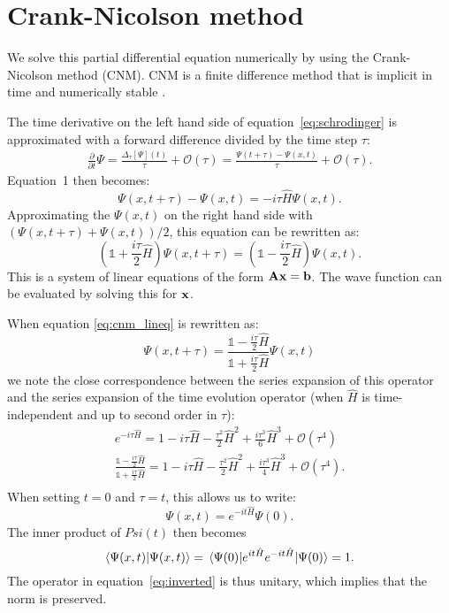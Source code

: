\section{Crank-Nicolson method}
We solve this partial differential equation numerically by using the Crank-Nicolson method (CNM). CNM is a finite difference method that is implicit in time and numerically stable \cite{cnm}. 

The time derivative on the left hand side of equation~\ref{eq:schrodinger} is approximated with a forward difference divided by the time step $\tau$:
\begin{gather*}
    \frac{\partial}{\partial t}\Psi 
    = \frac{\Delta_\tau[\Psi](t)}{\tau} + \mathcal{O}(\tau)
    = \frac{\Psi(t + \tau) - \Psi(x,t)}{\tau} + \mathcal{O}(\tau).
\end{gather*} Equation~1 then becomes:
\[
    \Psi(x,t+\tau)-\Psi(x,t) 
    = -i\tau\hat{H}\Psi(x,t).
\] Approximating the $\Psi(x,t)$ on the right hand side with $\left(\Psi(x,t+\tau)+\Psi(x,t)\right)/2$, this equation can be rewritten as:
\begin{equation}\label{eq:cnm_lineq}
    \left(\mathbb{1}+\frac{i\tau}{2}\hat{H}\right)\Psi(x,t+\tau) 
    = \left(\mathbb{1}-\frac{i\tau}{2}\hat{H}\right)\Psi(x,t).
\end{equation} This is a system of linear equations of the form $\mathbf{A}\vb{x}=\vb{b}$. The wave function can be evaluated by solving this for $\vb{x}$. 

When equation \ref{eq:cnm_lineq} is rewritten as:
\begin{equation}\label{eq:inverted}
\Psi(x,t+\tau) 
    = \frac{\mathbb{1}-\frac{i\tau}{2}\hat{H}}{\mathbb{1}+\frac{i\tau}{2}\hat{H}}\Psi(x,t)
\end{equation} we note the close correspondence between the series expansion of this operator and the series expansion of the time evolution operator (when $\hat{H}$ is time-independent and up to second order in $\tau$):
\begin{gather*}
    e^{-i\tau\hat{H}} 
    = 1 - i \tau\hat{H} - \frac{\tau^2}{2}\hat{H}^2 + \frac{i\tau^3}{6}\hat{H}^3 + \mathcal{O}(\tau^4)\\
    \frac{\mathbb{1}-\frac{i\tau}{2}\hat{H}}{\mathbb{1}+\frac{i\tau}{2}\hat{H}} 
    = 1 - i \tau\hat{H} - \frac{\tau^2}{2}\hat{H}^2 + \frac{i\tau^3}{4}\hat{H}^3 + \mathcal{O}(\tau^4).\\
\end{gather*}
When setting $t=0$ and $\tau=t$, this allows us to write:
\[
    \Psi(x,t)
    = e^{-it \hat{H}} \Psi(0).
\] The inner product of $Psi(t)$ then becomes
\[
    \braket{\Psi(x,t)}{\Psi(x,t)}
    = \ev*{e^{it\hat{H}} e^{-it\hat{H}}}{\Psi(0)}
    = 1.
\] The operator in equation~\ref{eq:inverted} is thus unitary, which implies that the norm is preserved.

